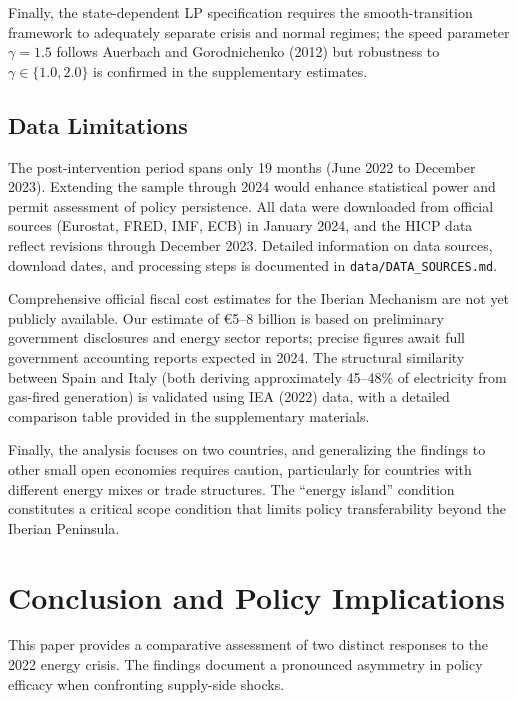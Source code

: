 \documentclass[12pt, a4paper]{article}
\begin{document}
Finally, the state-dependent LP specification requires the smooth-transition framework to adequately separate crisis and normal regimes; the speed parameter $\gamma = 1.5$ follows Auerbach and Gorodnichenko (2012) but robustness to $\gamma \in \{1.0, 2.0\}$ is confirmed in the supplementary estimates.


\subsection{Data Limitations}

The post-intervention period spans only 19 months (June 2022 to December 2023). Extending the sample through 2024 would enhance statistical power and permit assessment of policy persistence. All data were downloaded from official sources (Eurostat, FRED, IMF, ECB) in January 2024, and the HICP data reflect revisions through December 2023. Detailed information on data sources, download dates, and processing steps is documented in \texttt{data/DATA\_SOURCES.md}.

Comprehensive official fiscal cost estimates for the Iberian Mechanism are not yet publicly available. Our estimate of \euro5--8 billion is based on preliminary government disclosures and energy sector reports; precise figures await full government accounting reports expected in 2024. The structural similarity between Spain and Italy (both deriving approximately 45--48\% of electricity from gas-fired generation) is validated using IEA (2022) data, with a detailed comparison table provided in the supplementary materials.

Finally, the analysis focuses on two countries, and generalizing the findings to other small open economies requires caution, particularly for countries with different energy mixes or trade structures. The ``energy island'' condition constitutes a critical scope condition that limits policy transferability beyond the Iberian Peninsula.



\section{Conclusion and Policy Implications}

This paper provides a comparative assessment of two distinct responses to the 2022 energy crisis. The findings document a pronounced asymmetry in policy efficacy when confronting supply-side shocks.
\end{document}
